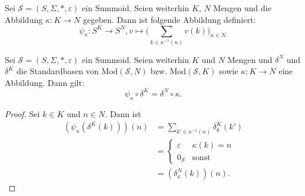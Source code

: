 \documentclass{article}
\begin{document}
\begin{definition}
  Sei $\mathcal{S} = (S, \Sigma, \ast, \varepsilon)$ ein Summoid.
  Seien weiterhin $K$, $N$ Mengen und die Abbildung $\kappa \colon K \to N$ gegeben.
  Dann ist folgende Abbildung definiert:
  \begin{equation*}
    \psi_\kappa \colon S^K \to S^N, v \mapsto \Bigg(\sum_{k \in \kappa^{-1}(n)} v(k)\Bigg)_{n \in N\text{.}}
  \end{equation*}
\end{definition}

\begin{theorem}
  Sei $\mathcal{S} = (S, \Sigma, \ast, \varepsilon)$ ein Summoid.
  Seien weiterhin $K$ und $N$ Mengen und $\delta^N$ und $\delta^K$ die
  Standardbasen von $\text{Mod}(\mathcal{S}, N)$ bzw. $\text{Mod}(\mathcal{S}, K)$
  sowie $\kappa \colon K \to N$ eine Abbildung.
  Dann gilt:
  \begin{equation*}
    \psi_\kappa \circ \delta^K = \delta^N \circ \kappa.
  \end{equation*}
\end{theorem}
\begin{proof}
  Sei $k \in K$ und $n \in N$. Dann ist
  \begin{align*}
    (\psi_\kappa(\delta^K(k)))(n) 
    &= \sum_{k' \in \kappa^{-1}(n)}\delta^K_k(k') \\
    &= \begin{cases}
      \varepsilon & \kappa(k) = n \\
      0_\mathcal{S} & \text{sonst}
    \end{cases} \\
    &= (\delta^N_\kappa(k))(n).
  \end{align*}
\end{proof}
\end{document}
